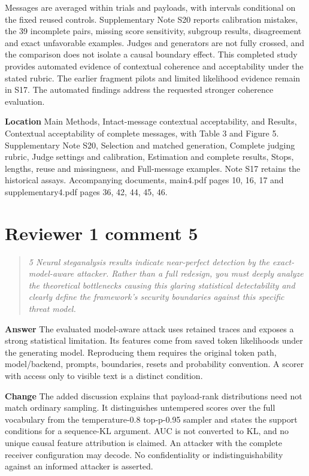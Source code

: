 \documentclass[11pt]{article}
\newenvironment{reviewcomment}{\begin{quote}\color{commentgray}\itshape}{\end{quote}}
\begin{document}
Messages are averaged within trials and payloads, with intervals conditional on the fixed reused controls. Supplementary Note S20 reports calibration mistakes, the 39 incomplete pairs, missing score sensitivity, subgroup results, disagreement and exact unfavorable examples. Judges and generators are not fully crossed, and the comparison does not isolate a causal boundary effect. This completed study provides automated evidence of contextual coherence and acceptability under the stated rubric. The earlier fragment pilots and limited likelihood evidence remain in S17. The automated findings address the requested stronger coherence evaluation.

\textbf{Location} Main Methods, Intact-message contextual acceptability, and Results, Contextual acceptability of complete messages, with Table 3 and Figure 5. Supplementary Note S20, Selection and matched generation, Complete judging rubric, Judge settings and calibration, Estimation and complete results, Stops, lengths, reuse and missingness, and Full-message examples. Note S17 retains the historical assays. Accompanying documents, main4.pdf pages 10, 16, 17 and supplementary4.pdf pages 36, 42, 44, 45, 46.


\section*{Reviewer 1 comment 5}\label{resp:R1-5}
\begin{reviewcomment}
5 Neural steganalysis results indicate near-perfect detection by the exact-model-aware attacker. Rather than a full redesign, you must deeply analyze the theoretical bottlenecks causing this glaring statistical detectability and clearly define the framework's security boundaries against this specific threat model.
\end{reviewcomment}

\textbf{Answer} The evaluated model-aware attack uses retained traces and exposes a strong statistical limitation. Its features come from saved token likelihoods under the generating model. Reproducing them requires the original token path, model/backend, prompts, boundaries, resets and probability convention. A scorer with access only to visible text is a distinct condition.

\textbf{Change} The added discussion explains that payload-rank distributions need not match ordinary sampling. It distinguishes untempered scores over the full vocabulary from the temperature-0.8 top-p-0.95 sampler and states the support conditions for a sequence-KL argument. AUC is not converted to KL, and no unique causal feature attribution is claimed. An attacker with the complete receiver configuration may decode. No confidentiality or indistinguishability against an informed attacker is asserted.
\end{document}
